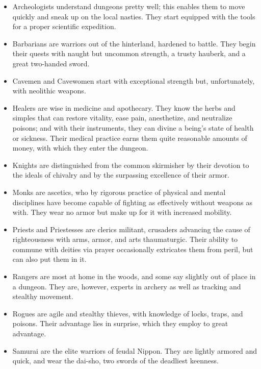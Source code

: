 \documentclass[11pt]{article}
\begin{document}
\begin{itemize}
\item Archeologists understand dungeons pretty well; this enables them to
move quickly and sneak up on the local nasties.  They start equipped
with the tools for a proper scientific expedition.

\item Barbarians are warriors out of the hinterland, hardened to
battle. They begin their quests with naught but uncommon strength, a
trusty hauberk, and a great two-handed sword.

\item Cavemen and Cavewomen start with exceptional strength but,
unfortunately, with neolithic weapons.

\item Healers are wise in medicine and apothecary.  They know the herbs
and simples that can restore vitality, ease pain, anesthetize, and
neutralize poisons; and with their instruments, they can divine a
being's state of health or sickness.  Their medical practice earns
them quite reasonable amounts of money, with which they enter the
dungeon.

\item Knights are distinguished from the common skirmisher by their
devotion to the ideals of chivalry and by the surpassing excellence
of their armor.

\item Monks are ascetics, who by rigorous practice of physical and mental
disciplines have become capable of fighting as effectively without
weapons as with.  They wear no armor but make up for it with
increased mobility.

\item Priests and Priestesses are clerics militant, crusaders advancing
the cause of righteousness with arms, armor, and arts thaumaturgic.
Their ability to commune with deities via prayer occasionally
extricates them from peril, but can also put them in it.

\item Rangers are most at home in the woods, and some say slightly out of
place in a dungeon.  They are, however, experts in archery as well
as tracking and stealthy movement.

\item Rogues are agile and stealthy thieves, with knowledge of locks,
traps, and poisons.  Their advantage lies in surprise, which they
employ to great advantage.

\item Samurai are the elite warriors of feudal Nippon.  They are lightly
armored and quick, and wear the dai-sho, two swords of the deadliest
keenness.


\end{itemize}
\end{document}
